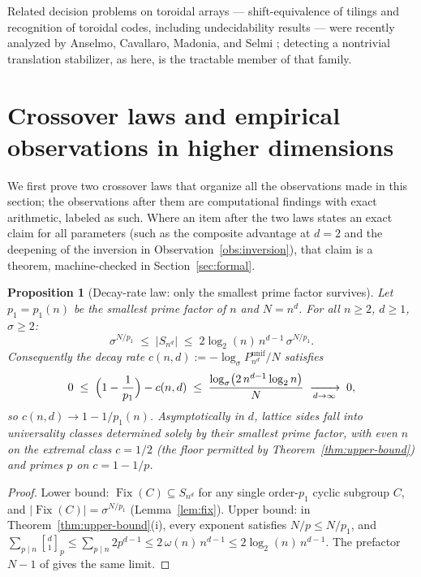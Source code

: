 \documentclass[11pt,a4paper]{article}
\newtheorem{proposition}[theorem]{Proposition}
\theoremstyle{remark}
\DeclareMathOperator{\Fix}{Fix}
\newcommand{\gaussbinom}[2]{\genfrac{[}{]}{0pt}{}{#1}{#2}}
\begin{document}
Related decision problems on toroidal arrays --- shift-equivalence of
tilings and recognition of toroidal codes, including undecidability
results --- were recently analyzed by Anselmo, Cavallaro, Madonia, and
Selmi \cite{anselmo2025}; detecting a nontrivial translation stabilizer,
as here, is the tractable member of that family.

\section{Crossover laws and empirical observations in higher dimensions}
\label{sec:empirical}

We first prove two crossover laws that organize all the observations made in this section; the observations after them are computational findings with
exact arithmetic, labeled as such. Where an item after the two laws
states an exact claim for all parameters (such as the composite
advantage at $d=2$ and the deepening of the inversion in
Observation~\ref{obs:inversion}), that claim is a theorem,
machine-checked in Section~\ref{sec:formal}.

\begin{proposition}[Decay-rate law: only the smallest prime factor
survives]\label{prop:rate}
Let $p_1=p_1(n)$ be the smallest prime factor of $n$ and $N=n^d$. For all
$n\ge2$, $d\ge1$, $\sigma\ge2$:
\[
    \sigma^{N/p_1}\;\le\;|S_{n^d}|\;\le\;
    2\log_2(n)\,n^{d-1}\,\sigma^{N/p_1}.
\]
Consequently the decay rate $c(n,d):=-\log_\sigma
P^{\mathrm{unif}}_{n^d}/N$ satisfies
\[
    0\;\le\;\Bigl(1-\frac1{p_1}\Bigr)-c(n,d)\;\le\;
    \frac{\log_\sigma\bigl(2\,n^{d-1}\log_2 n\bigr)}{N}
    \;\xrightarrow[d\to\infty]{}\;0 ,
\]
so $c(n,d)\to1-1/p_1(n)$. Asymptotically in $d$, lattice sides fall into
\emph{universality classes} determined solely by their smallest prime
factor, with even $n$ on the extremal class $c=1/2$ (the floor permitted
by Theorem~\ref{thm:upper-bound}) and primes $p$ on $c=1-1/p$.
\end{proposition}

\begin{proof}
Lower bound: $\Fix(C)\subseteq S_{n^d}$ for any single order-$p_1$ cyclic
subgroup $C$, and $|\Fix(C)|=\sigma^{N/p_1}$ (Lemma~\ref{lem:fix}).
Upper bound: in Theorem~\ref{thm:upper-bound}(i), every exponent satisfies
$N/p\le N/p_1$, and
$\sum_{p\mid n}\gaussbinom d1_p\le\sum_{p\mid n}2p^{d-1}
\le2\,\omega(n)\,n^{d-1}\le2\log_2(n)\,n^{d-1}$.
The prefactor $N-1$ of \cite[Thm.~5(ii)]{cg2017} gives the same limit.
\end{proof}
\end{document}
